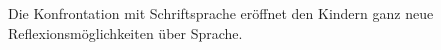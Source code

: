 Die Konfrontation mit Schriftsprache eröffnet den Kindern ganz neue Reflexionsmöglichkeiten über Sprache.